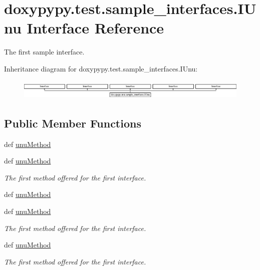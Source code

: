 \hypertarget{classdoxypypy_1_1test_1_1sample__interfaces_1_1_i_unu}{\section{doxypypy.\-test.\-sample\-\_\-interfaces.\-I\-Unu Interface Reference}
\label{classdoxypypy_1_1test_1_1sample__interfaces_1_1_i_unu}
}


The first sample interface.  


Inheritance diagram for doxypypy.\-test.\-sample\-\_\-interfaces.\-I\-Unu\-:\begin{figure}[H]
\begin{center}
\leavevmode
\includegraphics[height=0.961373cm]{classdoxypypy_1_1test_1_1sample__interfaces_1_1_i_unu}
\end{center}
\end{figure}
\subsection*{Public Member Functions}
\begin{DoxyCompactItemize}
\item 
def \hyperlink{classdoxypypy_1_1test_1_1sample__interfaces_1_1_i_unu_a825eba78ea76cb0ed535fb16b9247203}{unu\-Method}
\item 
def \hyperlink{classdoxypypy_1_1test_1_1sample__interfaces_1_1_i_unu_a825eba78ea76cb0ed535fb16b9247203}{unu\-Method}
\begin{DoxyCompactList}\small\item\em The first method offered for the first interface. \end{DoxyCompactList}\item 
def \hyperlink{classdoxypypy_1_1test_1_1sample__interfaces_1_1_i_unu_a825eba78ea76cb0ed535fb16b9247203}{unu\-Method}
\item 
def \hyperlink{classdoxypypy_1_1test_1_1sample__interfaces_1_1_i_unu_a825eba78ea76cb0ed535fb16b9247203}{unu\-Method}
\begin{DoxyCompactList}\small\item\em The first method offered for the first interface. \end{DoxyCompactList}\item 
def \hyperlink{classdoxypypy_1_1test_1_1sample__interfaces_1_1_i_unu_a825eba78ea76cb0ed535fb16b9247203}{unu\-Method}
\begin{DoxyCompactList}\small\item\em The first method offered for the first interface. \end{DoxyCompactList}\end{DoxyCompactItemize}


